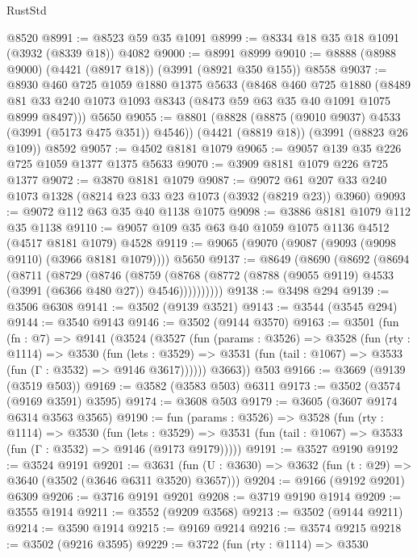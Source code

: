 \begin{lexlean}{RustStd}
\begin{coremodule}
    @8520
@8991 := @8523 @59 @35 @1091
@8999 := @8334 @18 @35 @18 @1091 (@3932 (@8339 @18)) @4082
@9000 := @8991 @8999
@9010 := @8888 (@8988 @9000) (@4421 (@8917 @18)) (@3991 (@8921 @350 @155)) @8558
@9037 := @8930
    @460
    @725
    @1059
    @1880
    @1375
    @5633
    (@8468
      @460
      @725
      @1880
      (@8489 @81 @33 @240 @1073 @1093 @8343 (@8473 @59 @63 @35 @40 @1091 @1075 @8999 @8497)))
    @5650
@9055 := @8801
    (@8828 (@8875 (@9010 @9037) @4533 (@3991 (@5173 @475 @351)) @4546))
    (@4421 (@8819 @18))
    (@3991 (@8823 @26 @109))
    @8592
@9057 := @4502 @8181 @1079
@9065 := @9057 @139 @35 @226 @725 @1059 @1377 @1375 @5633
@9070 := @3909 @8181 @1079 @226 @725 @1377
@9072 := @3870 @8181 @1079
@9087 := @9072 @61 @207 @33 @240 @1073 @1328 (@8214 @23 @33 @23 @1073 (@3932 (@8219 @23)) @3960)
@9093 := @9072 @112 @63 @35 @40 @1138 @1075
@9098 := @3886 @8181 @1079 @112 @35 @1138
@9110 := @9057 @109 @35 @63 @40 @1059 @1075 @1136 @4512 (@4517 @8181 @1079) @4528
@9119 := @9065 (@9070 (@9087 (@9093 (@9098 @9110) (@3966 @8181 @1079)))) @5650
@9137 := @8649
    (@8690
      (@8692
        (@8694
          (@8711
            (@8729
              (@8746
                (@8759
                  (@8768 (@8772 (@8788 (@9055 @9119) @4533 (@3991 (@6366 @480 @27)) @4546))))))))))
@9138 := @3498 @294
@9139 := @3506 @6308
@9141 := @3502 (@9139 @3521)
@9143 := @3544 (@3545 @294)
@9144 := @3540 @9143
@9146 := @3502 (@9144 @3570)
@9163 := @3501
    (fun (fn : @7) =>
    @9141
      (@3524
        (@3527
          (fun (params : @3526) =>
          @3528
            (fun (rty : @1114) =>
            @3530
              (fun (lets : @3529) =>
              @3531 (fun (tail : @1067) => @3533 (fun (Γ : @3532) => @9146 @3617))))))
        @3663))
    @503
@9166 := @3669 (@9139 (@3519 @503))
@9169 := @3582 (@3583 @503) @6311
@9173 := @3502 (@3574 (@9169 @3591) @3595)
@9174 := @3608 @503
@9179 := @3605 (@3607 @9174 @6314 @3563 @3565)
@9190 := fun (params : @3526) =>
  @3528
    (fun (rty : @1114) =>
    @3530
      (fun (lets : @3529) =>
      @3531 (fun (tail : @1067) => @3533 (fun (Γ : @3532) => @9146 (@9173 @9179)))))
@9191 := @3527 @9190
@9192 := @3524 @9191
@9201 := @3631 (fun (U : @3630) => @3632 (fun (t : @29) => @3640 (@3502 (@3646 @6311 @3520) @3657)))
@9204 := @9166 (@9192 @9201) @6309
@9206 := @3716 @9191 @9201
@9208 := @3719 @9190 @1914
@9209 := @3555 @1914
@9211 := @3552 (@9209 @3568)
@9213 := @3502 (@9144 @9211)
@9214 := @3590 @1914
@9215 := @9169 @9214
@9216 := @3574 @9215
@9218 := @3502 (@9216 @3595)
@9229 := @3722
    (fun (rty : @1114) =>
    @3530

\end{coremodule}
\end{lexlean}
